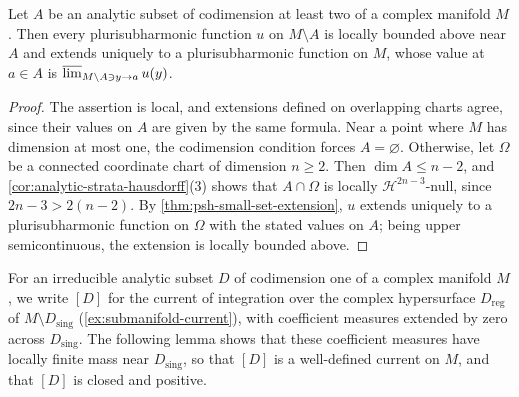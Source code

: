 \begin{corollary}\label{cor:analytic-codimension-two-psh-removal}
Let $A$ be an analytic subset of codimension at least two of a complex manifold $M$. Then every plurisubharmonic function $u$ on $M\setminus A$ is locally bounded above near $A$ and extends uniquely to a plurisubharmonic function on $M$, whose value at $a\in A$ is $\varlimsup_{M\setminus A\ni y\to a}u(y)$.
\end{corollary}
\begin{proof}
The assertion is local, and extensions defined on overlapping charts agree, since their values on $A$ are given by the same formula. Near a point where $M$ has dimension at most one, the codimension condition forces $A=\varnothing$. Otherwise, let $\Omega$ be a connected coordinate chart of dimension $n\geq2$. Then $\dim A\leq n-2$, and \cref{cor:analytic-strata-hausdorff}(3) shows that $A\cap\Omega$ is locally $\mathcal H^{2n-3}$-null, since $2n-3>2(n-2)$. By \cref{thm:psh-small-set-extension}, $u$ extends uniquely to a plurisubharmonic function on $\Omega$ with the stated values on $A$; being upper semicontinuous, the extension is locally bounded above.
\end{proof}

For an irreducible analytic subset $D$ of codimension one of a complex manifold $M$, we write $[D]$ for the current of integration over the complex hypersurface $D_{\mathrm{reg}}$ of $M\setminus D_{\mathrm{sing}}$ (\cref{ex:submanifold-current}), with coefficient measures extended by zero across $D_{\mathrm{sing}}$. The following lemma shows that these coefficient measures have locally finite mass near $D_{\mathrm{sing}}$, so that $[D]$ is a well-defined current on $M$, and that $[D]$ is closed and positive.

